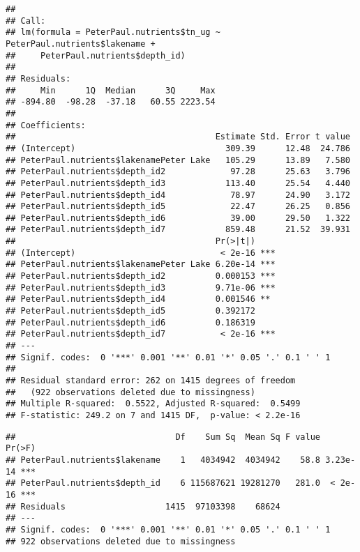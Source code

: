 \documentclass[]{article}
\newenvironment{Shaded}{\begin{snugshade}}{\end{snugshade}}
\newcommand{\KeywordTok}[1]{\textcolor[rgb]{0.13,0.29,0.53}{\textbf{#1}}}
\newcommand{\StringTok}[1]{\textcolor[rgb]{0.31,0.60,0.02}{#1}}
\newcommand{\CommentTok}[1]{\textcolor[rgb]{0.56,0.35,0.01}{\textit{#1}}}
\newcommand{\OperatorTok}[1]{\textcolor[rgb]{0.81,0.36,0.00}{\textbf{#1}}}
\newcommand{\NormalTok}[1]{#1}
\begin{document}
\begin{verbatim}
## 
## Call:
## lm(formula = PeterPaul.nutrients$tn_ug ~ PeterPaul.nutrients$lakename + 
##     PeterPaul.nutrients$depth_id)
## 
## Residuals:
##     Min      1Q  Median      3Q     Max 
## -894.80  -98.28  -37.18   60.55 2223.54 
## 
## Coefficients:
##                                        Estimate Std. Error t value
## (Intercept)                              309.39      12.48  24.786
## PeterPaul.nutrients$lakenamePeter Lake   105.29      13.89   7.580
## PeterPaul.nutrients$depth_id2             97.28      25.63   3.796
## PeterPaul.nutrients$depth_id3            113.40      25.54   4.440
## PeterPaul.nutrients$depth_id4             78.97      24.90   3.172
## PeterPaul.nutrients$depth_id5             22.47      26.25   0.856
## PeterPaul.nutrients$depth_id6             39.00      29.50   1.322
## PeterPaul.nutrients$depth_id7            859.48      21.52  39.931
##                                        Pr(>|t|)    
## (Intercept)                             < 2e-16 ***
## PeterPaul.nutrients$lakenamePeter Lake 6.20e-14 ***
## PeterPaul.nutrients$depth_id2          0.000153 ***
## PeterPaul.nutrients$depth_id3          9.71e-06 ***
## PeterPaul.nutrients$depth_id4          0.001546 ** 
## PeterPaul.nutrients$depth_id5          0.392172    
## PeterPaul.nutrients$depth_id6          0.186319    
## PeterPaul.nutrients$depth_id7           < 2e-16 ***
## ---
## Signif. codes:  0 '***' 0.001 '**' 0.01 '*' 0.05 '.' 0.1 ' ' 1
## 
## Residual standard error: 262 on 1415 degrees of freedom
##   (922 observations deleted due to missingness)
## Multiple R-squared:  0.5522, Adjusted R-squared:  0.5499 
## F-statistic: 249.2 on 7 and 1415 DF,  p-value: < 2.2e-16
\end{verbatim}

\begin{Shaded}
\end{Shaded}

\begin{verbatim}
##                                Df    Sum Sq  Mean Sq F value   Pr(>F)    
## PeterPaul.nutrients$lakename    1   4034942  4034942    58.8 3.23e-14 ***
## PeterPaul.nutrients$depth_id    6 115687621 19281270   281.0  < 2e-16 ***
## Residuals                    1415  97103398    68624                     
## ---
## Signif. codes:  0 '***' 0.001 '**' 0.01 '*' 0.05 '.' 0.1 ' ' 1
## 922 observations deleted due to missingness
\end{verbatim}
\end{document}
